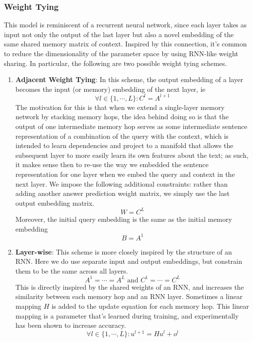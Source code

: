 \documentclass{article}
\begin{document}
\subsubsection{Weight Tying}
This model is reminiscent of a recurrent neural network, since each layer takes as input not only the output of the last layer but also a novel embedding of the same shared memory matrix of context. Inspired by this connection, it's common to reduce the dimensionality of the parameter space by using RNN-like weight sharing. In particular, the following are two possible weight tying schemes.
\newline
\begin{enumerate}
    \item \textbf{Adjacent Weight Tying}: In this scheme, the output embedding of a layer becomes the input (or memory) embedding of the next layer, ie
        $$ \forall l \in \{ 1, \cdots, L \}: C^l = A^{l + 1} $$
    The motivation for this is that when we extend a single-layer memory network by stacking memory hops, the idea behind doing so is that the output of one intermediate memory hop serves as some intermediate sentence representation of a combination of the query with the context, which is intended to learn dependencies and project to a manifold that allows the subsequent layer to more easily learn its own features about the text; as such, it makes sense then to re-use the way we embedded the sentence representation for one layer when we embed the query and context in the next layer.
    \newline
    We impose the following additional constraints: rather than adding another answer prediction weight matrix, we simply use the last output embedding matrix.
        $$ W = C^L $$
    Moreover, the initial query embedding is the same as the initial memory embedding
        $$ B = A^1 $$
    \item \textbf{Layer-wise}: This scheme is more closely inspired by the structure of an RNN. Here we do use separate input and output embeddings, but constrain them to be the same across all layers.
        $$ A^1 = \cdots = A^L \text{ and } C^1 = \cdots = C^L $$
    This is directly inspired by the shared weights of an RNN, and increases the similarity between each memory hop and an RNN layer. Sometimes a linear mapping $ H $ is added to the update equation for each memory hop. This linear mapping is a parameter that's learned during training, and experimentally has been shown to increase accuracy.
        $$ \forall l \in \{ 1, \cdots, L \}: u^{l + 1} = H u^l + o^l $$
\end{enumerate}
\end{document}
